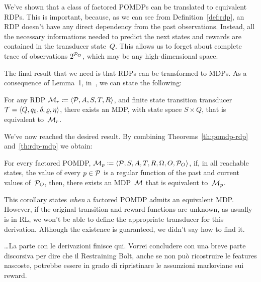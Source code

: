 We've shown that a class of factored POMDPs can be translated to equivalent
RDPs. This is important, because, as we can see from Definition~\ref{def:rdp},
an RDP doesn't have any direct dependency from the past observations. Instead,
all the necessary informations needed to predict the next states and rewards
are contained in the transducer state~$Q$. This allows us to forget about
complete trace of observations $2^{\mathcal{P}_O}$, which may be any
high-dimensional space.

The final result that we need is that RDPs can be transformed to MDPs. As a
consequence of Lemma~1, in~\cite{bib:rdp}, we can state the following:
\begin{theorem}
	For any RDP $\mathcal{M}_r \coloneqq \langle \mathcal{P}, A, S, T, R \rangle$,
	and finite state transition transducer $\mathcal{T} = \langle Q, q_0, \delta,
	\varrho, \eta \rangle$, there exists an MDP, with state space $S \times Q$,
	that is equivalent to~$\mathcal{M}_r$.
	\label{th:rdp-mdp}
\end{theorem}

We've now reached the desired result. By combining Theorems~\ref{th:pomdp-rdp}
and~\ref{th:rdp-mdp} we obtain:
\begin{corollary}
	For every factored POMDP, $\mathcal{M}_p \coloneqq \langle
	\mathcal{P}, S, A, T, R, \Omega, O, \mathcal{P}_O \rangle$, if, in all
	reachable states, the value of every $p \in \mathcal{P}$ is a regular
	function of the past and current values of~$\mathcal{P}_O$, then,
	there exists an MDP~$\mathcal{M}$ that is equivalent to~$\mathcal{M}_p$.
\end{corollary}

This corollary states \emph{when} a factored POMDP admits an equivalent MDP.
However, if the original transition and reward functions are unknown, as
usually is in RL, we won't be able to define the appropriate transducer for
this derivation.  Although the existence is guaranteed, we didn't say how to
find it.

\dots La parte con le derivazioni finisce qui. Vorrei concludere con una breve
parte discorsiva per dire che il Restraining Bolt, anche se non può
ricostruire le features nascoste, potrebbe essere in grado di ripristinare le
assunzioni markoviane sui reward.



